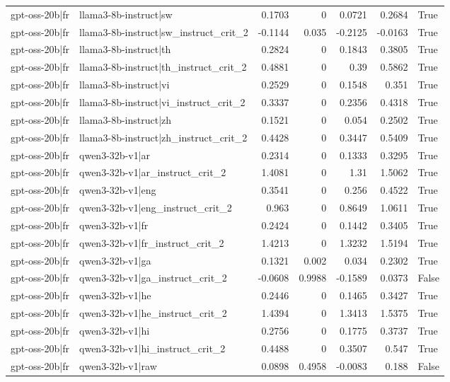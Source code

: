 \begin{table}
\begin{tabular}{l l r r r r l}
gpt-oss-20b|fr & llama3-8b-instruct|sw & 0.1703 & 0 & 0.0721 & 0.2684 & True \\
gpt-oss-20b|fr & llama3-8b-instruct|sw_instruct_crit_2 & -0.1144 & 0.035 & -0.2125 & -0.0163 & True \\
gpt-oss-20b|fr & llama3-8b-instruct|th & 0.2824 & 0 & 0.1843 & 0.3805 & True \\
gpt-oss-20b|fr & llama3-8b-instruct|th_instruct_crit_2 & 0.4881 & 0 & 0.39 & 0.5862 & True \\
gpt-oss-20b|fr & llama3-8b-instruct|vi & 0.2529 & 0 & 0.1548 & 0.351 & True \\
gpt-oss-20b|fr & llama3-8b-instruct|vi_instruct_crit_2 & 0.3337 & 0 & 0.2356 & 0.4318 & True \\
gpt-oss-20b|fr & llama3-8b-instruct|zh & 0.1521 & 0 & 0.054 & 0.2502 & True \\
gpt-oss-20b|fr & llama3-8b-instruct|zh_instruct_crit_2 & 0.4428 & 0 & 0.3447 & 0.5409 & True \\
gpt-oss-20b|fr & qwen3-32b-v1|ar & 0.2314 & 0 & 0.1333 & 0.3295 & True \\
gpt-oss-20b|fr & qwen3-32b-v1|ar_instruct_crit_2 & 1.4081 & 0 & 1.31 & 1.5062 & True \\
gpt-oss-20b|fr & qwen3-32b-v1|eng & 0.3541 & 0 & 0.256 & 0.4522 & True \\
gpt-oss-20b|fr & qwen3-32b-v1|eng_instruct_crit_2 & 0.963 & 0 & 0.8649 & 1.0611 & True \\
gpt-oss-20b|fr & qwen3-32b-v1|fr & 0.2424 & 0 & 0.1442 & 0.3405 & True \\
gpt-oss-20b|fr & qwen3-32b-v1|fr_instruct_crit_2 & 1.4213 & 0 & 1.3232 & 1.5194 & True \\
gpt-oss-20b|fr & qwen3-32b-v1|ga & 0.1321 & 0.002 & 0.034 & 0.2302 & True \\
gpt-oss-20b|fr & qwen3-32b-v1|ga_instruct_crit_2 & -0.0608 & 0.9988 & -0.1589 & 0.0373 & False \\
gpt-oss-20b|fr & qwen3-32b-v1|he & 0.2446 & 0 & 0.1465 & 0.3427 & True \\
gpt-oss-20b|fr & qwen3-32b-v1|he_instruct_crit_2 & 1.4394 & 0 & 1.3413 & 1.5375 & True \\
gpt-oss-20b|fr & qwen3-32b-v1|hi & 0.2756 & 0 & 0.1775 & 0.3737 & True \\
gpt-oss-20b|fr & qwen3-32b-v1|hi_instruct_crit_2 & 0.4488 & 0 & 0.3507 & 0.547 & True \\
gpt-oss-20b|fr & qwen3-32b-v1|raw & 0.0898 & 0.4958 & -0.0083 & 0.188 & False \\

\end{tabular}
\end{table}
